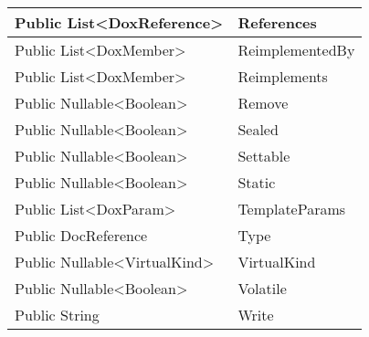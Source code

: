 \documentclass[11pt, oneside, a4paper]{book}
\begin{document}
\begin{center}
\begin{tabular}{| p{3cm} | p{12cm} | }
\hline
 Public  List<DoxReference> &  References\hypertarget{SoftwareEngineeringTools.{}Documentation.{}DoxField.{}References}{}\\
\hline
 Public  List<DoxMember> &  ReimplementedBy\hypertarget{SoftwareEngineeringTools.{}Documentation.{}DoxField.{}ReimplementedBy}{}\\
\hline
 Public  List<DoxMember> &  Reimplements\hypertarget{SoftwareEngineeringTools.{}Documentation.{}DoxField.{}Reimplements}{}\\
\hline
 Public  Nullable<Boolean> &  Remove\hypertarget{SoftwareEngineeringTools.{}Documentation.{}DoxField.{}Remove}{}\\
\hline
 Public  Nullable<Boolean> &  Sealed\hypertarget{SoftwareEngineeringTools.{}Documentation.{}DoxField.{}Sealed}{}\\
\hline
 Public  Nullable<Boolean> &  Settable\hypertarget{SoftwareEngineeringTools.{}Documentation.{}DoxField.{}Settable}{}\\
\hline
 Public  Nullable<Boolean> &  Static\hypertarget{SoftwareEngineeringTools.{}Documentation.{}DoxField.{}Static}{}\\
\hline
 Public  List<DoxParam> &  TemplateParams\hypertarget{SoftwareEngineeringTools.{}Documentation.{}DoxField.{}TemplateParams}{}\\
\hline
 Public  DocReference &  Type\hypertarget{SoftwareEngineeringTools.{}Documentation.{}DoxField.{}Type}{}\\
\hline
 Public  Nullable<VirtualKind> &  VirtualKind\hypertarget{SoftwareEngineeringTools.{}Documentation.{}DoxField.{}VirtualKind}{}\\
\hline
 Public  Nullable<Boolean> &  Volatile\hypertarget{SoftwareEngineeringTools.{}Documentation.{}DoxField.{}Volatile}{}\\
\hline
 Public  String &  Write\hypertarget{SoftwareEngineeringTools.{}Documentation.{}DoxField.{}Write}{}\\
\hline
\end{tabular}
\end{center}
\end{document}
